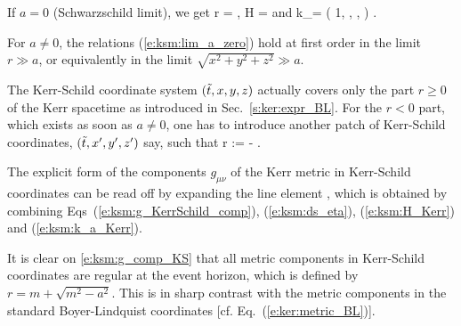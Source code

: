 \begin{remark}
If $a=0$ (Schwarzschild limit), we get
\be \label{e:ksm:lim_a_zero}
    r = , \quad
    H =  \quad\mbox{and}\quad
    k_\alpha = \left( 1,\; ,\; ,\;  \right) .
\ee
\end{remark}

\begin{remark}
For $a \not = 0$, the relations (\ref{e:ksm:lim_a_zero}) hold at first order
in the limit $r \gg a$, or equivalently in the limit $\sqrt{x^2 + y^2 + z^2} \gg a$.
\end{remark}

The Kerr-Schild coordinate system $({\tilde t},x,y,z)$ actually covers only
the part $r\geq 0$ of the Kerr spacetime as introduced in Sec.~\ref{s:ker:expr_BL}.
For the $r<0$ part, which exists as soon as $a\not=0$,
one has to introduce another patch of Kerr-Schild coordinates, $({\tilde t},x',y',z')$ say, such
that
\be
    r := -  .
\ee


The explicit form of the components
$g_{\mu\nu}$ of the Kerr metric in Kerr-Schild coordinates can be read off by expanding the line
element
\be \label{e:ksm:g_comp_KS}
 ,
\ee
which is obtained by combining Eqs~(\ref{e:ksm:g_KerrSchild_comp}), (\ref{e:ksm:ds_eta}), (\ref{e:ksm:H_Kerr})
and (\ref{e:ksm:k_a_Kerr}).
\begin{remark}
It is clear on \eqref{e:ksm:g_comp_KS} that all metric components in Kerr-Schild
coordinates are regular at the event horizon, which is defined by $r= m + \sqrt{m^2-a^2}$.
This is in sharp contrast with the metric components in the standard
Boyer-Lindquist coordinates [cf. Eq.~(\ref{e:ker:metric_BL})].
\end{remark}

